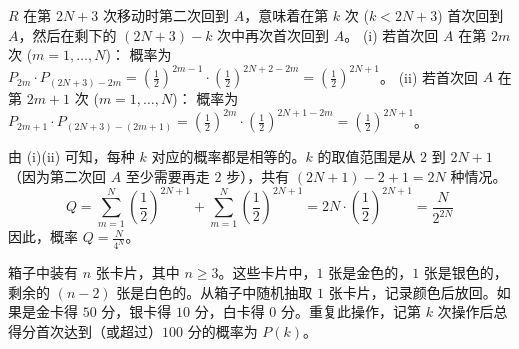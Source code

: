 \begin{questions}
\begin{parts}
\begin{solution}
    $R$ 在第 $2N+3$ 次移动时第二次回到 $A$，意味着在第 $k$ 次 ($k < 2N+3$) 首次回到 $A$，然后在剩下的 $(2N+3)-k$ 次中再次首次回到 $A$。
    (i) 若首次回 $A$ 在第 $2m$ 次 ($m=1, \dots, N$)：
    概率为 $P_{2m} \cdot P_{(2N+3)-2m} = \left(\frac{1}{2}\right)^{2m-1} \cdot \left(\frac{1}{2}\right)^{2N+2-2m} = \left(\frac{1}{2}\right)^{2N+1}$。
    (ii) 若首次回 $A$ 在第 $2m+1$ 次 ($m=1, \dots, N$)：
    概率为 $P_{2m+1} \cdot P_{(2N+3)-(2m+1)} = \left(\frac{1}{2}\right)^{2m} \cdot \left(\frac{1}{2}\right)^{2N+1-2m} = \left(\frac{1}{2}\right)^{2N+1}$。
    
    由 (i)(ii) 可知，每种 $k$ 对应的概率都是相等的。$k$ 的取值范围是从 $2$ 到 $2N+1$（因为第二次回 $A$ 至少需要再走 $2$ 步），共有 $(2N+1)-2+1 = 2N$ 种情况。
    \[ Q = \sum_{m=1}^{N} \left(\frac{1}{2}\right)^{2N+1} + \sum_{m=1}^{N} \left(\frac{1}{2}\right)^{2N+1} = 2N \cdot \left(\frac{1}{2}\right)^{2N+1} = \frac{N}{2^{2N}} \]
    因此，概率 $Q = \frac{N}{4^N}$。
    \end{solution}
\end{parts}

\question
箱子中装有 $n$ 张卡片，其中 $n \ge 3$。这些卡片中，$1$ 张是金色的，$1$ 张是银色的，剩余的 $(n-2)$ 张是白色的。从箱子中随机抽取 $1$ 张卡片，记录颜色后放回。如果是金卡得 $50$ 分，银卡得 $10$ 分，白卡得 $0$ 分。重复此操作，记第 $k$ 次操作后总得分首次达到（或超过）$100$ 分的概率为 $P(k)$。
\end{questions}
